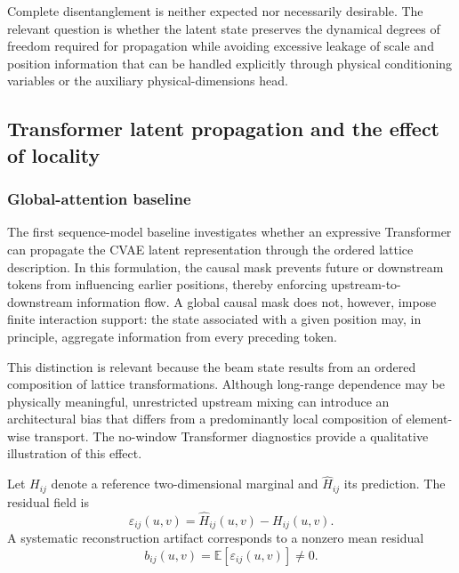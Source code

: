 Complete disentanglement is neither expected nor necessarily desirable. The relevant question is whether the latent state preserves the dynamical degrees of freedom required for propagation while avoiding excessive leakage of scale and position information that can be handled explicitly through physical conditioning variables or the auxiliary physical-dimensions head.

\subsection{Transformer latent propagation and the effect of locality}
\label{subsec:results_transformer_locality}

\subsubsection{Global-attention baseline}
\label{subsubsec:results_nowindow_transformer}

The first sequence-model baseline investigates whether an expressive Transformer can propagate the CVAE latent representation through the ordered lattice description. In this formulation, the causal mask prevents future or downstream tokens from influencing earlier positions, thereby enforcing upstream-to-downstream information flow. A global causal mask does not, however, impose finite interaction support: the state associated with a given position may, in principle, aggregate information from every preceding token.

This distinction is relevant because the beam state results from an ordered composition of lattice transformations. Although long-range dependence may be physically meaningful, unrestricted upstream mixing can introduce an architectural bias that differs from a predominantly local composition of element-wise transport. The no-window Transformer diagnostics provide a qualitative illustration of this effect.

Let \(H_{ij}\) denote a reference two-dimensional marginal and
\(\widehat{H}_{ij}\) its prediction. The residual field is
\begin{equation}
\varepsilon_{ij}(u,v)
=
\widehat{H}_{ij}(u,v)
-
H_{ij}(u,v).
\label{eq:histogram_residual_field}
\end{equation}
A systematic reconstruction artifact corresponds to a nonzero mean residual
\begin{equation}
b_{ij}(u,v)
=
\mathbb{E}
\left[
\varepsilon_{ij}(u,v)
\right]
\neq 0.
\label{eq:residual_bias_revised}
\end{equation}

